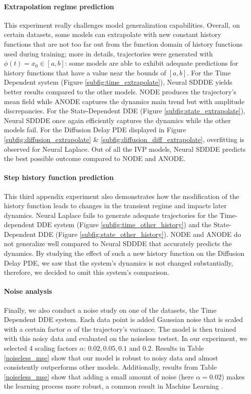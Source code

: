\documentclass[pmlr]{jmlr}%
\begin{document}
\paragraph{Extrapolation regime prediction} This experiment really challenges model generalization capabilities. Overall, on certain datasets, some models can extrapolate with new constant history functions that are not too far out from the function domain of history functions used during training; more in details,  trajectories were generated with $\phi(t) = x_0\in [a,b]$: some models are able to exhibit adequate predictions for history functions that have a value near the bounds of $[a,b]$. For the Time Dependent system (Figure \ref{subfig:time_extrapolate}), Neural SDDDE yields better results compared to the other models. NODE produces the trajectory's mean field while ANODE captures the dynamics main trend but with amplitude discrepancies. For the State-Dependent DDE (Figure \ref{subfig:state_extrapolate}), Neural SDDDE once again efficiently captures the dynamics while the other models fail. For the Diffusion Delay PDE displayed in Figure \ref{subfig:diffusion_extrapolate} \& \ref{subfig:diffusion_diff_extrapolate}, overfitting is observed for Neural Laplace. Out of all the IVP models, Neural SDDDE predicts the best possible outcome compared to NODE and ANODE. 

\paragraph{Step history function prediction} This third appendix experiment also demonstrates how the modification of the history function leads to changes in the transient regime and impacts later dynamics. Neural Laplace fails to generate adequate trajectories for the Time-dependent DDE system (Figure \ref{subfig:time_other_history}) and the State-Dependent DDE (Figure \ref{subfig:state_other_history}). NODE and ANODE do not generalize well compared to Neural SDDDE that accurately predicts the dynamics. By studying the effect of such a new history function on the Diffusion Delay PDE, we saw that the system's dynamics is not changed substantially, therefore, we decided to omit this system's comparison.



\paragraph{Noise analysis} Finally, we also conduct a noise study on one of the datasets, the Time Dependent DDE system. Each data point is added Gaussian noise that is scaled with a certain factor $\alpha$ of the trajectory's variance. The model is then trained with this noisy data and evaluated on the noiseless testset. In our experiment, we selected 4 scaling factors $\alpha$: $0.02, 0.05, 0.1$ and $0.2$. Results in Table \ref{noiseless_mse} show that our model is robust to noisy data and almost consistently outperforms other models. Additionally, results from Table \ref{noiseless_mse} show that adding a small amount of noise (here $\alpha = 0.02$) makes the learning process more robust, a common result in Machine Learning \citep{noise_robust1,noise_robust2}. 
\end{document}
